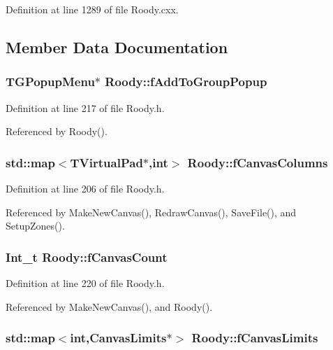 Definition at line 1289 of file Roody.cxx.

\subsection{Member Data Documentation}
\subsubsection[{fAddToGroupPopup}]{\setlength{\rightskip}{0pt plus 5cm}TGPopupMenu$\ast$ {\bf Roody::fAddToGroupPopup}\hspace{0.3cm}{\ttfamily  [private]}}\label{classRoody_a5033f3b11fe12cdb925bba00e4a9ea60}


Definition at line 217 of file Roody.h.

Referenced by Roody().
\subsubsection[{fCanvasColumns}]{\setlength{\rightskip}{0pt plus 5cm}std::map$<$TVirtualPad$\ast$,int$>$ {\bf Roody::fCanvasColumns}\hspace{0.3cm}{\ttfamily  [private]}}\label{classRoody_a20d9ee91e39c11deeec2f1cc86aa1518}


Definition at line 206 of file Roody.h.

Referenced by MakeNewCanvas(), RedrawCanvas(), SaveFile(), and SetupZones().
\subsubsection[{fCanvasCount}]{\setlength{\rightskip}{0pt plus 5cm}Int\_\-t {\bf Roody::fCanvasCount}\hspace{0.3cm}{\ttfamily  [private]}}\label{classRoody_a655286d7d4ad8c859e130c58372ded4f}


Definition at line 220 of file Roody.h.

Referenced by MakeNewCanvas(), and Roody().
\subsubsection[{fCanvasLimits}]{\setlength{\rightskip}{0pt plus 5cm}std::map$<$int,CanvasLimits$\ast$$>$ {\bf Roody::fCanvasLimits}\hspace{0.3cm}{\ttfamily  [private]}}\label{classRoody_a6fd004943ff3d8ee9e081dbdc18c2238}


